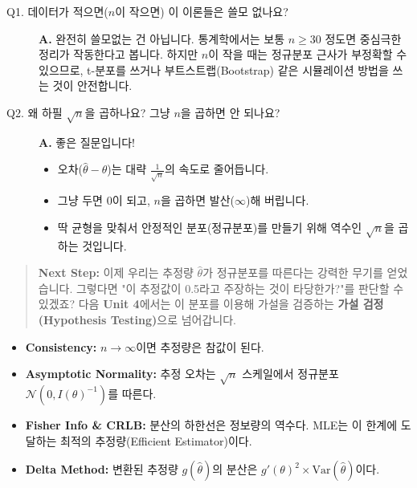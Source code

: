 \documentclass[11pt,a4paper]{book}
\theoremstyle{definition}
\begin{document}
\begin{description}
    \item[Q1. 데이터가 적으면($n$이 작으면) 이 이론들은 쓸모 없나요?]
    \textbf{A.} 완전히 쓸모없는 건 아닙니다. 통계학에서는 보통 $n \ge 30$ 정도면 중심극한정리가 작동한다고 봅니다. 하지만 $n$이 작을 때는 정규분포 근사가 부정확할 수 있으므로, t-분포를 쓰거나 부트스트랩(Bootstrap) 같은 시뮬레이션 방법을 쓰는 것이 안전합니다.
    
    \item[Q2. 왜 하필 $\sqrt{n}$을 곱하나요? 그냥 $n$을 곱하면 안 되나요?]
    \textbf{A.} 좋은 질문입니다! 
    \begin{itemize}
        \item 오차($\hat{\theta} - \theta$)는 대략 $\frac{1}{\sqrt{n}}$의 속도로 줄어듭니다.
        \item 그냥 두면 0이 되고, $n$을 곱하면 발산($\infty$)해 버립니다.
        \item 딱 균형을 맞춰서 안정적인 분포(정규분포)를 만들기 위해 역수인 $\sqrt{n}$을 곱하는 것입니다.
    \end{itemize}
\end{description}

\vspace{1cm}
\begin{quote}
\textbf{Next Step:} 이제 우리는 추정량 $\hat{\theta}$가 정규분포를 따른다는 강력한 무기를 얻었습니다. 그렇다면 "이 추정값이 0.5라고 주장하는 것이 타당한가?"를 판단할 수 있겠죠? 다음 \textbf{Unit 4}에서는 이 분포를 이용해 가설을 검증하는 \textbf{가설 검정(Hypothesis Testing)}으로 넘어갑니다.
\end{quote}

\begin{summarybox}[title={Unit 3 핵심 요약}]
\begin{itemize}
    \item \textbf{Consistency:} $n \to \infty$이면 추정량은 참값이 된다.
    \item \textbf{Asymptotic Normality:} 추정 오차는 $\sqrt{n}$ 스케일에서 정규분포 $\mathcal{N}(0, I(\theta)^{-1})$를 따른다.
    \item \textbf{Fisher Info \& CRLB:} 분산의 하한선은 정보량의 역수다. MLE는 이 한계에 도달하는 최적의 추정량(Efficient Estimator)이다.
    \item \textbf{Delta Method:} 변환된 추정량 $g(\hat{\theta})$의 분산은 $g'(\theta)^2 \times \text{Var}(\hat{\theta})$이다.
\end{itemize}
\end{summarybox}
\end{document}
